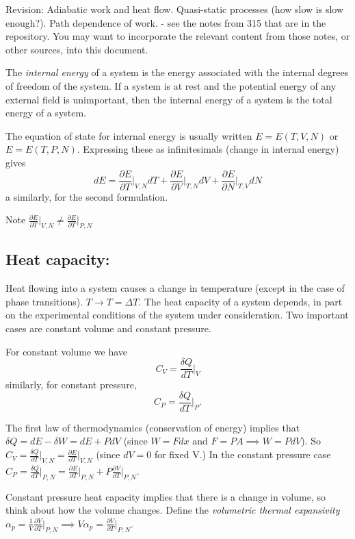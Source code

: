 \documentclass{article}
\begin{document}
Revision: Adiabatic work and heat flow. Quasi-static processes (how slow is slow enough?). Path dependence of work.
 - see the notes from 315 that are in the repository. You may want to incorporate the relevant content from those notes, or other sources, into this document.


The \emph{internal energy} of a system is the energy associated with the internal degrees of freedom of the system. If a system is at rest and the potential energy of any external field is unimportant, then the internal energy of a system is the total energy of a system.

The equation of state for internal energy is usually written $E = E(T,V,N)$ or $E = E(T,P,N)$. Expressing these as infinitesimals (change in internal energy) gives
$$ dE = \frac{\partial E}{\partial T}\bigg\vert_{V,N}dT + \frac{\partial E}{\partial V}\bigg\vert_{T,N}dV +\frac{\partial E}{\partial N}\bigg\vert_{T,V}dN$$
a similarly, for the second formulation.

Note $ \frac{\partial E}{\partial T}\vert_{V,N} \neq \frac{\partial E}{\partial T}\vert_{P,N} $

\subsection*{Heat capacity:}
Heat flowing into a system causes a change in temperature (except in the case of phase transitions). $T\rightarrow T=\Delta T$. The heat capacity of a system depends, in part on the experimental conditions of the system under consideration. Two important cases are constant volume and constant pressure.

For constant volume we have
$$C_V = \frac{\delta Q}{dT}\bigg\vert_V$$
similarly, for constant pressure,
$$C_P = \frac{\delta Q}{dT}\bigg\vert_P.$$

The first law of thermodynamics (conservation of energy) implies that $\delta Q = dE - \delta W = dE + PdV$  (since $W = Fdx$ and $F=PA \implies W = PdV$). So
$C_V = \frac{\delta Q}{\partial T}\vert_{V,N} = \frac{\partial E}{\partial T}\vert_{V,N}$ (since $dV=0$ for fixed V.)
In the constant pressure case $C_P = \frac{\delta Q}{dT}\vert_{P,N} = \frac{\partial E}{\partial T}\vert_{P,N} + P\frac{\partial V}{\partial T}\vert_{P,N}$.

Constant pressure heat capacity implies that there is a change in volume, so think about how the volume changes. Define the \emph{volumetric thermal expansivity} $\alpha_p = \frac{1}{V}\frac{\partial V}{\partial T}\vert_{P,N} \implies V\alpha_p =\frac{\partial V}{\partial T}\vert_{P,N}$.
\end{document}
